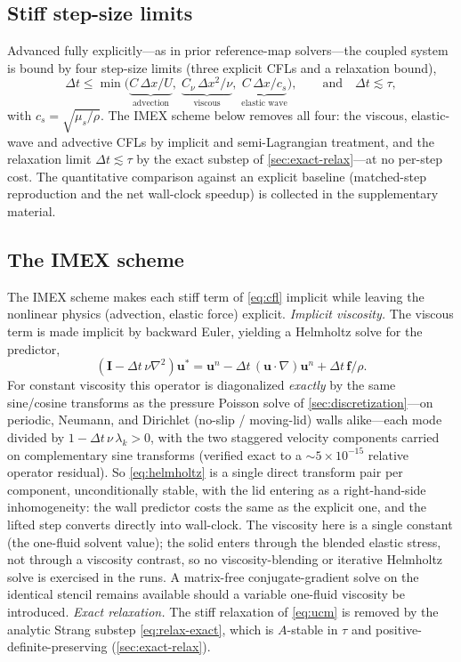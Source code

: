 \documentclass[final,3p,times]{elsarticle}
\theoremstyle{remark}
\newcommand{\uv}{\bm{u}}                 %
\newcommand{\It}{\bm{I}}                %
\newcommand{\grad}{\nabla}
\newcommand{\dt}{\Delta t}
\newcommand{\dx}{\Delta x}
\begin{document}
\subsection{Stiff step-size limits}
Advanced fully explicitly---as in prior reference-map solvers---the coupled system is bound by
four step-size limits (three explicit CFLs and a relaxation bound),
\begin{equation}
\dt \le \min\!\Big(
\underbrace{C\,\dx/U}_{\text{advection}},\;
\underbrace{C_\nu\,\dx^2/\nu}_{\text{viscous}},\;
\underbrace{C\,\dx/c_s}_{\text{elastic wave}}\Big),
\qquad \text{and}\quad \dt\lesssim\tau,
\label{eq:cfl}
\end{equation}
with $c_s=\sqrt{\mu_s/\rho}$. The IMEX scheme below removes all four: the viscous, elastic-wave
and advective CFLs by implicit and semi-Lagrangian treatment, and the relaxation limit
$\dt\lesssim\tau$ by the exact substep of \cref{sec:exact-relax}---at no per-step cost. The
quantitative comparison against an explicit baseline (matched-step reproduction and the net
wall-clock speedup) is collected in the supplementary material.

\subsection{The IMEX scheme}
\label{sec:imex}
\label{sec:elastic-stab}%
The IMEX scheme makes each stiff term of \cref{eq:cfl} implicit while leaving the nonlinear
physics (advection, elastic force) explicit.
\emph{Implicit viscosity.} The viscous term is made implicit by
backward Euler, yielding a Helmholtz solve for the predictor,
\begin{equation}
\left(\It-\dt\,\nu\nabla^2\right)\uv^{*}
   = \uv^{n} - \dt\,(\uv\!\cdot\!\grad)\uv^{n} + \dt\,\bm f/\rho .
\label{eq:helmholtz}
\end{equation}
For constant viscosity this operator is diagonalized \emph{exactly} by the same
sine/cosine transforms as the pressure Poisson solve of \cref{sec:discretization}---on
periodic, Neumann, and Dirichlet (no-slip / moving-lid) walls alike---each mode divided by
$1-\dt\,\nu\,\lambda_k>0$, with the two staggered velocity components carried on complementary
sine transforms (verified exact to a ${\sim}5\times10^{-15}$ relative operator residual). So
\cref{eq:helmholtz} is a single direct transform pair per
component, unconditionally stable, with the lid entering as a right-hand-side
inhomogeneity: the wall predictor costs the same as the explicit one, and the lifted step
converts directly into wall-clock. The viscosity here is a single constant (the one-fluid
solvent value); the solid enters through the blended elastic stress, not through a
viscosity contrast, so no viscosity-blending or iterative Helmholtz solve is exercised in the
runs. A matrix-free conjugate-gradient solve on the identical
stencil remains available should a variable one-fluid viscosity be introduced. \emph{Exact relaxation.} The stiff relaxation of \cref{eq:ucm} is removed by the analytic
Strang substep \cref{eq:relax-exact}, which is $A$-stable in $\tau$ and
positive-definite-preserving (\cref{sec:exact-relax}).
\end{document}
